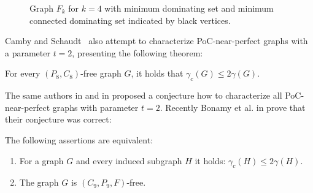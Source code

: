 \begin{figure}
        \centering
        \begin{minipage}{.5\textwidth}
                \centering
                
                \caption*{}
        \end{minipage}%
        \begin{minipage}{.5\textwidth}
                \centering
                
                \caption*{}
        \end{minipage}
	\caption{Graph \(F_k\) for \(k=4\)
	with minimum dominating set and minimum connected dominating set indicated by black vertices.}
        \label{pic:fks}
\end{figure}

Camby and Schaudt~\cite{CambySchaudt14} also attempt to characterize PoC-near-perfect graphs with a parameter \(t=2\),
presenting the following theorem:

\begin{thm}\label{DSpoc3}
For every \((P_8 , C_8)\)-free graph \(G\), it holds that
	\(\gamma_c(G) \leq 2 \gamma(G).\)
\end{thm}
The same authors in \cite{CambySchaudt14} and in \cite{Camby19} proposed a conjecture how to characterize all PoC-near-perfect graphs
with parameter \(t = 2\). Recently Bonamy et al. in \cite{Bonamy18} prove that their conjecture was correct:
\begin{thm}\label{DSpoc:3}
The following assertions are equivalent:
\begin{enumerate}
	\item For a graph \(G\) and every induced subgraph \(H\) it holds: \(\gamma_c(H) \leq 2\gamma(H).\)
	\item The graph \(G\) is \((C_9, P_9, F)\)-free.
\end{enumerate}
\end{thm}

